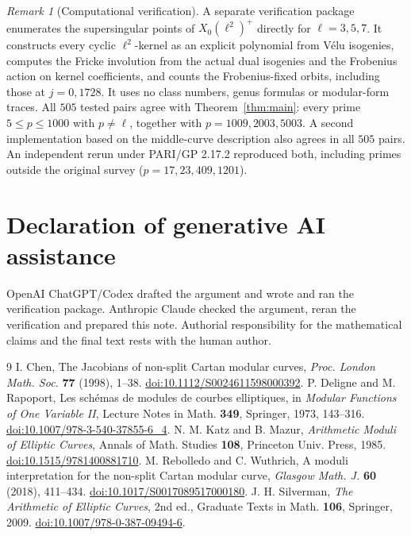 \documentclass[11pt,a4paper]{article}
\theoremstyle{remark}\newtheorem{remark}[theorem]{Remark}
\numberwithin{equation}{section}
\begin{document}
\begin{remark}[Computational verification]
A separate verification package enumerates the supersingular points of $X_0(\ell^2)^+$ directly for $\ell=3,5,7$. It constructs every cyclic $\ell^2$-kernel as an explicit polynomial from V\'elu isogenies, computes the Fricke involution from the actual dual isogenies and the Frobenius action on kernel coefficients, and counts the Frobenius-fixed orbits, including those at $j=0,1728$. It uses no class numbers, genus formulas or modular-form traces. All $505$ tested pairs agree with Theorem~\ref{thm:main}: every prime $5\leq p\leq1000$ with $p\neq\ell$, together with $p=1009,2003,5003$. A second implementation based on the middle-curve description also agrees in all $505$ pairs. An independent rerun under PARI/GP 2.17.2 reproduced both, including primes outside the original survey ($p=17,23,409,1201$).
\end{remark}

\section*{Declaration of generative AI assistance}
OpenAI ChatGPT/Codex drafted the argument and wrote and ran the verification package. Anthropic Claude checked the argument, reran the verification and prepared this note. Authorial responsibility for the mathematical claims and the final text rests with the human author.

\begin{thebibliography}{9}\small
{} I. Chen, The Jacobians of non-split Cartan modular curves, \emph{Proc. London Math. Soc.} \textbf{77} (1998), 1--38. \href{https://doi.org/10.1112/S0024611598000392}{doi:10.1112/S0024611598000392}.
 P. Deligne and M. Rapoport, Les sch\'emas de modules de courbes elliptiques, in \emph{Modular Functions of One Variable II}, Lecture Notes in Math. \textbf{349}, Springer, 1973, 143--316. \href{https://doi.org/10.1007/978-3-540-37855-6_4}{doi:10.1007/978-3-540-37855-6\_4}.
 N. M. Katz and B. Mazur, \emph{Arithmetic Moduli of Elliptic Curves}, Annals of Math. Studies \textbf{108}, Princeton Univ. Press, 1985. \href{https://doi.org/10.1515/9781400881710}{doi:10.1515/9781400881710}.
 M. Rebolledo and C. Wuthrich, A moduli interpretation for the non-split Cartan modular curve, \emph{Glasgow Math. J.} \textbf{60} (2018), 411--434. \href{https://doi.org/10.1017/S0017089517000180}{doi:10.1017/S0017089517000180}.
 J. H. Silverman, \emph{The Arithmetic of Elliptic Curves}, 2nd ed., Graduate Texts in Math. \textbf{106}, Springer, 2009. \href{https://doi.org/10.1007/978-0-387-09494-6}{doi:10.1007/978-0-387-09494-6}.
\end{thebibliography}
\end{document}
